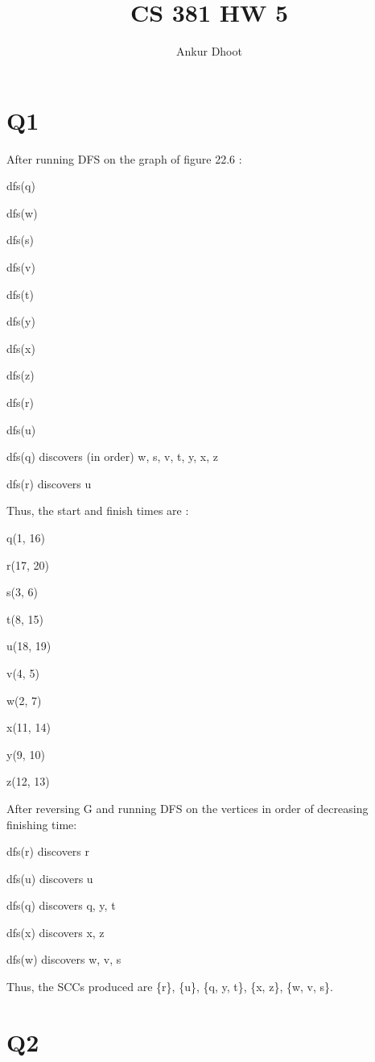 \documentclass[11pt,a4paper]{article}
\begin{document}
\author{Ankur Dhoot}
\title{CS 381 HW 5}
\maketitle

\section*{Q1}
After running DFS on the graph of figure 22.6 :

dfs(q)

\quad dfs(w)

\quad \quad dfs(s)

\quad \quad \quad dfs(v)

\quad dfs(t)

\quad \quad dfs(y)

\quad \quad dfs(x)

\quad \quad \quad dfs(z)

dfs(r)

\quad dfs(u)
\newline

dfs(q) discovers (in order) w, s, v, t, y, x, z

dfs(r) discovers u

Thus, the start and finish times are :

q(1, 16)

r(17, 20)

s(3, 6)

t(8, 15)

u(18, 19)

v(4, 5)

w(2, 7)

x(11, 14)

y(9, 10)

z(12, 13)

After reversing G and running DFS on the vertices in order of decreasing finishing time:

dfs(r) discovers r

dfs(u) discovers u

dfs(q) discovers q, y, t

dfs(x) discovers x, z

dfs(w) discovers w, v, s

Thus, the SCCs produced are \{r\}, \{u\}, \{q, y, t\}, \{x, z\}, \{w, v, s\}.

\section*{Q2}
\end{document}

